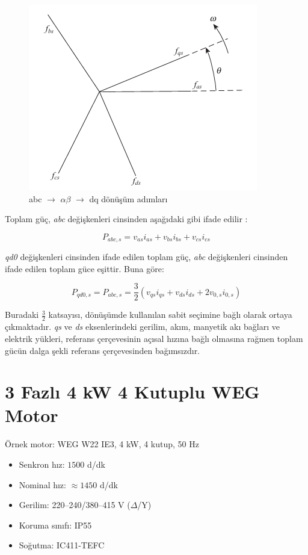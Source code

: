 \begin{figure}[H]
    \centering
    \includegraphics[width=0.3\linewidth]{imgs/dq_transformation.png}
    \caption{abc $\rightarrow$ $\alpha\beta$ $\rightarrow$ dq dönüşüm adımları}
    \label{fig:dq_transformation}
\end{figure}

Toplam güç, \textit{abc} değişkenleri cinsinden aşağıdaki gibi ifade edilir \cite{krause2013analysis}:

\begin{equation}
    P_{abc,s} = v_{as} i_{as} + v_{bs} i_{bs} + v_{cs} i_{cs}
\end{equation}

\textit{qd0} değişkenleri cinsinden ifade edilen toplam güç, \textit{abc} değişkenleri cinsinden ifade edilen toplam güce eşittir. Buna göre:

\begin{equation}
    P_{qd0,s} = P_{abc,s} = \frac{3}{2} \left( v_{qs} i_{qs} + v_{ds} i_{ds} + 2 v_{0,s} i_{0,s} \right)
\end{equation}

Buradaki $\frac{3}{2}$ katsayısı, dönüşümde kullanılan sabit seçimine bağlı olarak ortaya çıkmaktadır. \textit{qs} ve \textit{ds} eksenlerindeki gerilim, akım, manyetik akı bağları ve elektrik yükleri, referans çerçevesinin açısal hızına bağlı olmasına rağmen toplam gücün dalga şekli referans çerçevesinden bağımsızdır.



\section{3 Fazlı 4 kW 4 Kutuplu WEG Motor} Örnek motor: WEG W22 IE3, 4 kW, 4 kutup, 50 Hz \begin{itemize} \item Senkron hız: $1500$ d/dk \item Nominal hız: $\approx 1450$ d/dk \item Gerilim: 220–240/380–415 V ($\Delta$/Y) \item Koruma sınıfı: IP55 \item Soğutma: IC411-TEFC \end{itemize} 

